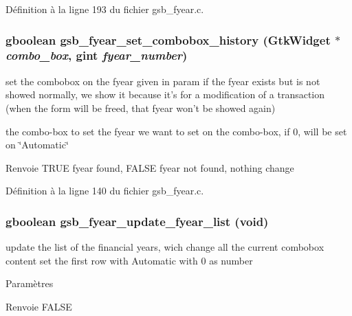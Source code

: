Définition à la ligne 193 du fichier gsb\_\-fyear.c.

\subsubsection[{gsb\_\-fyear\_\-set\_\-combobox\_\-history}]{\setlength{\rightskip}{0pt plus 5cm}gboolean gsb\_\-fyear\_\-set\_\-combobox\_\-history (GtkWidget $\ast$ {\em combo\_\-box}, \/  gint {\em fyear\_\-number})}\label{gsb__fyear_8h_aa7d81ecc027bf5ccacae5afd165b01c8}
set the combobox on the fyear given in param if the fyear exists but is not showed normally, we show it because it's for a modification of a transaction (when the form will be freed, that fyear won't be showed again)

the combo-\/box to set  the fyear we want to set on the combo-\/box, if 0, will be set on \char`\"{}Automatic\char`\"{}

\begin{DoxyReturn}{Renvoie}
TRUE fyear found, FALSE fyear not found, nothing change 
\end{DoxyReturn}


Définition à la ligne 140 du fichier gsb\_\-fyear.c.

\subsubsection[{gsb\_\-fyear\_\-update\_\-fyear\_\-list}]{\setlength{\rightskip}{0pt plus 5cm}gboolean gsb\_\-fyear\_\-update\_\-fyear\_\-list (void)}\label{gsb__fyear_8h_a1f37b63b2e43be7ebddf47e5f4b6ddb3}
update the list of the financial years, wich change all the current combobox content set the first row with Automatic with 0 as number


\begin{DoxyParams}{Paramètres}
\item[{\em }]\end{DoxyParams}
\begin{DoxyReturn}{Renvoie}
FALSE 
\end{DoxyReturn}



